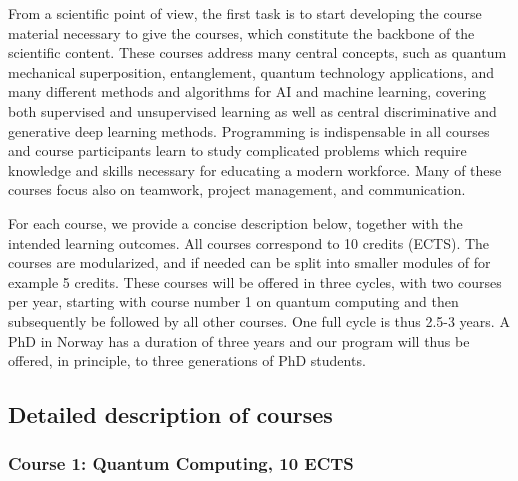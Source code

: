 \documentclass{scrreprt}
\begin{document}
From a scientific point of view, the first task is to start developing the course material necessary to give the courses, which constitute the backbone of the scientific content.
These courses address many central concepts, such as quantum
mechanical superposition, entanglement, quantum technology applications, and many
different methods and algorithms for AI and machine learning, covering
both supervised and unsupervised learning as well as central
discriminative and generative deep learning methods. Programming is
indispensable in all courses and course participants learn to
study complicated problems which require knowledge and skills
necessary for educating a modern workforce. Many of these courses
focus also on teamwork, project management, and communication.
\begin{comment}
The courses are
\begin{enumerate}
\item \textit{Quantum Computing},
\item \textit{Quantum Information Theory},
\item \textit{Building Quantum Hardware},
\item \textit{Quantum Metrology and Sensing}, and
\item \textit{Quantum Machine Learning}.
\end{enumerate}
\end{comment}
For each course, we provide a concise description below, together with the intended learning outcomes.
All courses correspond to 10 credits (ECTS). The courses are modularized, and if needed can be split into smaller modules of for example 5 credits. These courses will be offered in three cycles, with two courses per year, starting with course number 1 on quantum computing and then subsequently be followed by all other courses. One full cycle is thus 2.5-3 years. A PhD in Norway has a duration of three years and our program will thus be offered, in principle,  to three generations of PhD students. %

\subsection{Detailed description of courses}
\subsubsection{Course 1: Quantum Computing, 10 ECTS}
\end{document}
